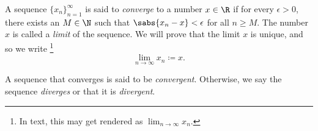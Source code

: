 \begin{defn}
A sequence $\{ x_n \}_{n=1}^\infty$ is said to \emph{converge} to a number
$x \in \R$ if for every $\epsilon > 0$, there exists an $M \in \N$ such
that $\sabs{x_n - x} < \epsilon$ for all $n \geq M$.
The number $x$ is called a \emph{limit} of the sequence.
We will prove that the limit $x$ is unique, and so we write%
\footnote{In text, this may get rendered as $\lim_{n\to\infty} x_n$.}
%
\begin{equation*}
\lim_{n\to \infty} x_n \coloneqq x .
\end{equation*}

A sequence
that converges is said to be \emph{convergent}.
Otherwise, we say the sequence \emph{diverges}
or that it is
\emph{divergent}.
\end{defn}
